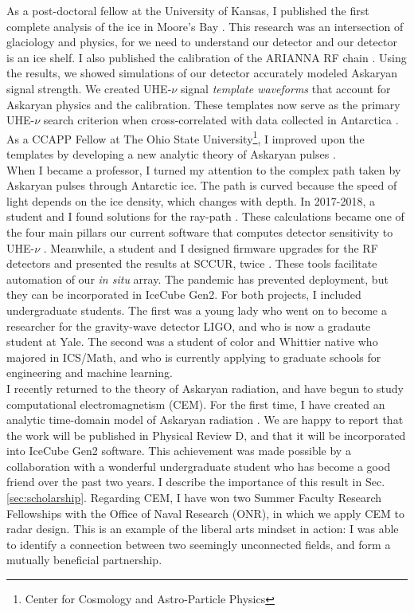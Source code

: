 \documentclass[../../main.tex]{subfiles}
\begin{document}
As a post-doctoral fellow at the University of Kansas, I published the first complete analysis of the ice in Moore's Bay \cite{10.3189/2015jog14j214}.  This research was an intersection of glaciology and physics, for we need to understand our detector and our detector is an ice shelf.  I also published the calibration of the ARIANNA RF chain \cite{10.1016/j.astropartphys.2014.09.002}. Using the results, we showed simulations of our detector accurately modeled Askaryan signal strength.  We created UHE-$\nu$ signal \textit{template waveforms} that account for Askaryan physics and the calibration.  These templates now serve as the primary UHE-$\nu$ search criterion when cross-correlated with data collected in Antarctica \cite{10.1016/j.astropartphys.2015.04.002} \cite{4_5}.  As a CCAPP Fellow at The Ohio State University\footnote{Center for Cosmology and Astro-Particle Physics}, I improved upon the templates by developing a new analytic theory of Askaryan pulses \cite{10.1016/j.astropartphys.2017.03.008}.
\\
\vspace{0.15cm}
When I became a professor, I turned my attention to the complex path taken by Askaryan pulses through Antarctic ice.  The path is curved because the speed of light depends on the ice density, which changes with depth.  In 2017-2018, a student and I found solutions for the ray-path \cite{Barwick:2018497}.  These calculations became one of the four main pillars our current software that computes detector sensitivity to UHE-$\nu$ \cite{10.1140/epjc/s10052-020-7612-8} \cite{10.1140/epjc/s10052-019-6971-5}.  Meanwhile, a student and I designed firmware upgrades for the RF detectors and presented the results at SCCUR, twice \cite{sccur1} \cite{sccur2}.  These tools facilitate automation of our \textit{in situ} array.  The pandemic has prevented deployment, but they can be incorporated in IceCube Gen2.  For both projects, I included undergraduate students.  The first was a young lady who went on to become a researcher for the gravity-wave detector LIGO, and who is now a gradaute student at Yale.  The second was a student of color and Whittier native who majored in ICS/Math, and who is currently applying to graduate schools for engineering and machine learning.
\\
\vspace{0.15cm}
I recently returned to the theory of Askaryan radiation, and have begun to study computational electromagnetism (CEM).  For the first time, I have created an analytic time-domain model of Askaryan radiation \cite{time}.  We are happy to report that the work will be published in Physical Review D, and that it will be incorporated into IceCube Gen2 software.  This achievement was made possible by a collaboration with a wonderful undergraduate student who has become a good friend over the past two years.  I describe the importance of this result in Sec. \ref{sec:scholarship}.  Regarding CEM, I have won two Summer Faculty Research Fellowships with the Office of Naval Research (ONR), in which we apply CEM to radar design.  This is an example of the liberal arts mindset in action: I was able to identify a connection between two seemingly unconnected fields, and form a mutually beneficial partnership.
\end{document}
